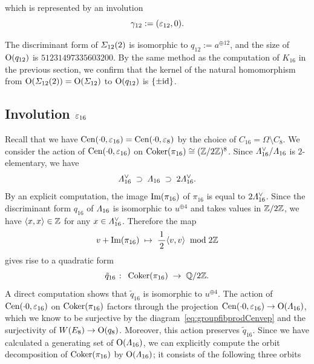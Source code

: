 \documentclass{amsart} %
\begin{document}
 which is 
 represented by an involution 
 \[
 \gamma_{12}:=(\varepsilon_{12}, 0).
 \]
 \begin{remark}\label{rem:q12}
 The discriminant form of $\varSigma_{12}(2)$ is isomorphic to
 $q_{12}:=a^{\oplus 12}$, 
and the size of $\mathord{\mathrm{O}}(q_{12})$ is $51231497335603200$.
 By the same method as the computation of $K_{16}$ in the previous section,
 we confirm that the kernel of the natural homomorphism from 
 $\mathord{\mathrm{O}}(\varSigma_{12}(2))=\mathord{\mathrm{O}}(\varSigma_{12})$ to $\mathord{\mathrm{O}}(q_{12})$ 
 is $\{\pm \mathord{\mathrm{id}}\}$.
 \end{remark}
\subsection{Involution $\varepsilon_{16}$}\label{subsec:vep16}
%
Recall that we have $\mathrm{Cen}(\cdot 0, \varepsilon_{16})=\mathrm{Cen}(\cdot 0, \varepsilon_{8})$
by the choice of $C_{16}=\Omega\setminus C_8$.
We consider the action of $\mathrm{Cen}(\cdot 0, \varepsilon_{16})$
on $\operatorname{Coker}(\pi_{16})\cong (\mathord{\mathbb{Z}}/2\mathord{\mathbb{Z}})^8$.
Since $\varLambda_{16}^{\vee}/\varLambda_{16}$ 
is $2$-elementary,
we have
%
\begin{equation} \label{eq:filteration}
\varLambda_{16}^{\vee} \;\supset\; \varLambda_{16}\; \supset \; 2\varLambda_{16}^{\vee}.
\end{equation}
%
By an explicit computation,
the image $\operatorname{Im}(\pi_{16})$ of $\pi_{16}$ is equal to $2\varLambda_{16}^{\vee}$.
Since the discriminant form $q_{16}$ of $\varLambda_{16}$ 
is isomorphic to $u^{\oplus 4}$ and takes values in $\mathord{\mathbb{Z}}/2\mathord{\mathbb{Z}}$,
we have $\langle x, x \rangle\in \mathord{\mathbb{Z}}$ for any $x\in \varLambda_{16}^{\vee}$.
Therefore the map
\[
v+\operatorname{Im} (\pi_{16}) \;\mapsto\; \frac{\,1\,}{2} \langle v, v \rangle \;\bmod 2\mathord{\mathbb{Z}}
\]
gives rise to a quadratic form 
\[
\tilde{q}_{16}\;\colon\; \operatorname{Coker} (\pi_{16})\;\to\; \mathord{\mathbb{Q}}/2\mathord{\mathbb{Z}}.
 \]
A direct computation shows  that $\tilde{q}_{16}$ is isomorphic to $u^{\oplus 4}$.
The action of $\mathrm{Cen}(\cdot 0, \varepsilon_{16})$ on $\operatorname{Coker} (\pi_{16})$ 
factors through the projection
$\mathrm{Cen}(\cdot 0, \varepsilon_{16})\to \mathord{\mathrm{O}}(\varLambda_{16})$,
which we know to be surjective
by the diagram~\eqref{eq:groupfibprodCenvep} and the surjectivity of 
$W(E_8)\to \mathord{\mathrm{O}}(q_8)$. 
Moreover, this action 
preserves $\tilde{q}_{16}$.
Since we have calculated a generating set of $\mathord{\mathrm{O}}(\varLambda_{16})$,
we can explicitly compute the orbit decomposition of $\operatorname{Coker} (\pi_{16})$
by $\mathord{\mathrm{O}}(\varLambda_{16})$; it consists of the following three orbits 
\end{document}
